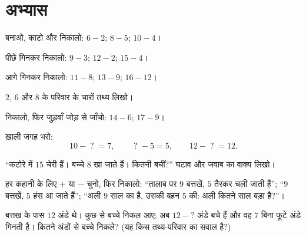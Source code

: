 \section{अभ्यास}

\begin{exercise}[$\star$]\label{exo:g1:subtraction:1}
बनाओ, काटो और निकालो: $6 - 2$; \quad $8 - 5$; \quad
$10 - 4$।
\end{exercise}

\begin{exercise}[$\star$]\label{exo:g1:subtraction:2}
पीछे गिनकर निकालो: $9 - 3$; \quad $12 - 2$; \quad
$15 - 4$।
\end{exercise}

\begin{exercise}[$\star$]\label{exo:g1:subtraction:3}
आगे गिनकर  निकालो: $11 - 8$; \quad $13 - 9$; \quad
$16 - 12$।
\end{exercise}

\begin{exercise}[$\star$]\label{exo:g1:subtraction:4}
$2$, $6$ और $8$ के परिवार के चारों तथ्य लिखो।
\end{exercise}

\begin{exercise}[$\star$]\label{exo:g1:subtraction:5}
निकालो, फिर जुड़वाँ जोड़ से जाँचो: $14 - 6$; \quad
$17 - 9$।
\end{exercise}

\begin{exercise}[$\star$]\label{exo:g1:subtraction:6}
ख़ाली जगह भरो:
\[
10 - \;?\; = 7, \qquad
\;?\; - 5 = 5, \qquad
12 - \;?\; = 12 .
\]
\end{exercise}

\begin{exercise}[$\star$]\label{exo:g1:subtraction:7}
``कटोरे में $15$ चेरी हैं। बच्चे $8$ खा जाते हैं। कितनी बचीं?''
घटाव और जवाब का वाक्य लिखो।
\end{exercise}

\begin{exercise}[$\star$]\label{exo:g1:subtraction:8}
हर कहानी के लिए $+$ या $-$ चुनो, फिर निकालो: ``तालाब पर $9$
बत्तखें, $5$ तैरकर चली जाती हैं''; ``$9$ बत्तखें, $5$ हंस आ जाते हैं'';
``अली $9$ साल का है, उसकी बहन $5$ की: अली कितने साल बड़ा है?''।
\end{exercise}

\begin{exercise}[$\star\star$]\label{exo:g1:subtraction:9}
बत्तख के पास $12$ अंडे थे। कुछ से बच्चे निकल आए; अब $12 - ?$ अंडे
बचे हैं और वह $7$ बिना फूटे अंडे गिनती है। कितने अंडों से बच्चे
निकले? (यह किस तथ्य-परिवार का सवाल है?)
\end{exercise}
